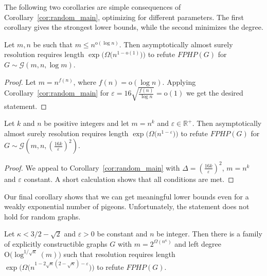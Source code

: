 \documentclass{article}
\newcommand{\Bigoh}[1]{\mathrm{O} \bigl( #1 \bigr)}
\newcommand{\littleoh}[1]{\mathrm{o} ( #1 )}
\newcommand{\Bigomega}[1]{\Omega \bigl( #1 \bigr)}
\newcommand{\bigomega}[1]{\Omega ( #1 )}
\newcommand{\Rplus}     {\mathbb{R}^{+}}
\newcommand{\refth}[1]{Theorem~\ref{#1}}
\newcommand{\refcor}[1]{Corollary~\ref{#1}}
\newcommand{\formulaformat}[1]{\mathit{#1}}
\newcommand{\graphfphpnot}[1][G]{\formulaformat{FPHP}({#1})}
\newcommand{\GFPHP}{G\text{-}FPHP}
\renewcommand{\GFPHP}{\graphfphpnot[G]}
\newcommand{\GdegMax}{\Delta}
\newcommand{\gdegmax}{\GdegMax}
\newcommand{\Gdist}{\mathcal{G}}
\newcommand{\exponentalpha}{\varepsilon}
\numberwithin{equation}{section}
\begin{document}
The following two corollaries are simple consequences of 
\refcor{cor:random_main}, optimizing
 for different parameters. The first corollary gives the
strongest lower bounds, while the second
minimizes the degree.

\begin{corollary}
  Let $m, n$ be such that
  $m \le n^{\littleoh{\log n}}$.
  Then asymptotically almost surely
  resolution requires length 
  $\exp \bigl( \Bigomega{n^{1-\littleoh{1}}} \bigr)$ to refute $\GFPHP$ 
	for $G \sim \Gdist \left(m,n,\log m\right)$.
\end{corollary}

\begin{proof}
  Let $m = n^{f(n)}$, where $f(n) = \littleoh{\log n}$. Applying
  \refcor{cor:random_main} for 
  $\exponentalpha = 16 \sqrt{\frac{f(n)}{\log n}} = \littleoh{1}$
  we get the desired statement.
\end{proof}



\begin{corollary}[Restatement of \refth{th:informal-poly-npigeons}]
  Let $k$ and $n$ 
  be positive integers and
  let $m = n^k$
  and
  $\exponentalpha \in \Rplus$.
  Then asymptotically almost surely
  resolution requires length 
  $\exp \bigl(\Bigomega{n^{1-\exponentalpha}}\bigr)$ to refute $\GFPHP$ 
  for 
  $G \sim \Gdist 
  \left(m, n, \left( \frac{16 k}{\exponentalpha} \right)^2 \right)$.
\end{corollary}

\begin{proof}
  We appeal to \refcor{cor:random_main} with 
  $\gdegmax = \left( \frac{16 k}{\varepsilon} \right)^2$,
  $m = n^{k}$ and 
  $\exponentalpha$ constant.
  A short calculation shows that all conditions are met.
\end{proof}



Our final corollary shows that we can get 
meaningful lower bounds even
for
a weakly exponential number of pigeons. Unfortunately,
the statement does not hold for random graphs.

\begin{corollary}\label{cor:main_subexp}
  Let $\kappa < 3/2 - \sqrt{2}$ and $\exponentalpha > 0$ be constant and
  $n$ be integer. Then
  there is a family of 
  explicitly constructible
  graphs $G$ with 
  $m = 2^{\bigomega{n^\kappa}}$ and
  left degree $\Bigoh{\log^{1 / \sqrt{\kappa}}(m)}$
  such that resolution requires
  length
  $
  \exp
  \bigl(
  \Bigomega{n^{1-2\sqrt{\kappa}(2 - \sqrt{\kappa}) - \exponentalpha}}
  \bigr)
  $
  to refute $\GFPHP$.
\end{corollary}
\end{document}
